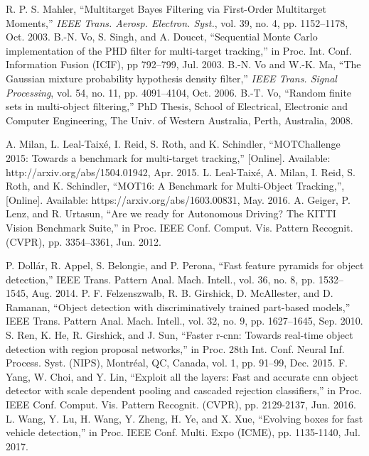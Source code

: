 \documentclass[journal]{IEEEtran}
\newcounter{ct}
\begin{document}
\ifCLASSOPTIONcaptionsoff
  \newpage
\fi









\begin{thebibliography}{00}

 R. P. S. Mahler, ``Multitarget Bayes Filtering via First-Order Multitarget Moments,'' \emph{IEEE Trans. Aerosp. Electron. Syst.}, vol. 39, no. 4, pp. 1152--1178, Oct. 2003.
 B.-N. Vo, S. Singh, and A. Doucet, ``Sequential Monte Carlo implementation of the PHD filter for multi-target tracking,'' in Proc. Int. Conf. Information Fusion (ICIF), pp 792--799, Jul. 2003.
 B.-N. Vo and W.-K. Ma, ``The Gaussian mixture probability hypothesis density filter,'' \emph{IEEE Trans. Signal Processing}, vol. 54, no. 11, pp. 4091--4104, Oct. 2006.
 B.-T. Vo, ``Random finite sets in multi-object filtering,'' PhD Thesis, School of Electrical, Electronic and Computer Engineering, The Univ. of Western Australia, Perth, Australia, 2008.

 A. Milan, L. Leal-Taix\'e, I. Reid, S. Roth, and K. Schindler, ``MOTChallenge 2015: Towards a benchmark for multi-target tracking,'' [Online]. Available: http://arxiv.org/abs/1504.01942, Apr. 2015.
 L. Leal-Taix\'e, A. Milan, I. Reid, S. Roth, and K. Schindler, ``MOT16: A Benchmark for Multi-Object Tracking,'', [Online]. Available: https://arxiv.org/abs/1603.00831, May. 2016.
 A. Geiger, P. Lenz, and R. Urtasun, ``Are we ready for Autonomous Driving? The KITTI Vision Benchmark Suite,'' in Proc. IEEE Conf. Comput. Vis. Pattern Recognit. (CVPR), pp. 3354--3361, Jun. 2012.

 P. Doll\'ar, R. Appel, S. Belongie, and P. Perona, ``Fast feature pyramids for object detection,'' IEEE Trans. Pattern Anal. Mach. Intell., vol. 36, no. 8, pp. 1532--1545, Aug. 2014.
 P. F. Felzenszwalb, R. B. Girshick, D. McAllester, and D. Ramanan, ``Object detection with discriminatively trained part-based models,'' IEEE Trans. Pattern Anal. Mach. Intell., vol. 32, no. 9, pp. 1627--1645, Sep. 2010.
 S. Ren, K. He, R. Girshick, and J. Sun, ``Faster r-cnn: Towards real-time object detection with region proposal networks,'' in Proc. 28th Int. Conf. Neural Inf. Process. Syst. (NIPS), Montr\'eal, QC, Canada, vol. 1, pp. 91--99, Dec. 2015.
F. Yang, W. Choi, and Y. Lin, ``Exploit all the layers: Fast and accurate cnn object detector with scale dependent pooling and cascaded rejection classifiers,'' in Proc. IEEE Conf. Comput. Vis. Pattern Recognit. (CVPR), pp. 2129-2137, Jun. 2016.
L. Wang, Y. Lu, H. Wang, Y. Zheng, H. Ye, and X. Xue, ``Evolving boxes for fast vehicle detection,'' in Proc. IEEE Conf. Multi. Expo (ICME), pp. 1135-1140, Jul. 2017.



\end{thebibliography}
\end{document}
